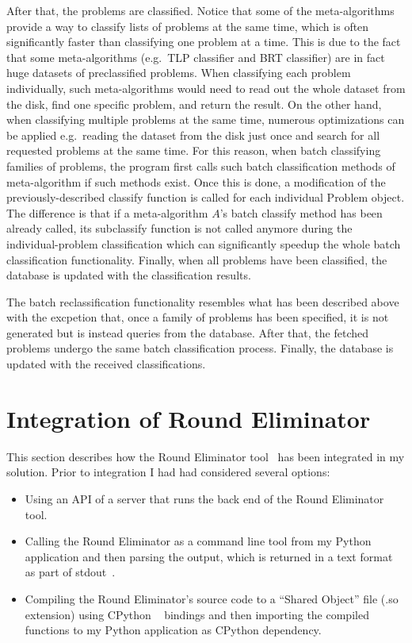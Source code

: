 After that, the problems are classified. Notice that
some of the meta-algorithms provide a way to classify
lists of problems at the same time, which is often
significantly faster than classifying one problem at a time.
This is due to the fact that some meta-algorithms
(e.g.\ TLP classifier and BRT classifier) are in fact
huge datasets of preclassified problems. When
classifying each problem individually, such
meta-algorithms would need to read out the whole
dataset from the disk, find one specific problem,
and return the result. On the other hand, when
classifying multiple problems at the same time,
numerous optimizations can be applied e.g.\ reading the 
dataset from the disk just once and search for all
requested problems at the same time. For this reason,
when batch classifying families of problems, the program first
calls such batch classification methods of meta-algorithm
if such methods exist. Once this is done, a modification
of the previously-described classify function is called
for each individual Problem object. The difference is
that if a meta-algorithm $A$'s batch classify method has been
already called, its subclassify function is not called
anymore during the individual-problem classification which
can significantly speedup the whole batch classification
functionality. Finally, when all problems have been classified,
the database is updated with the classification results.

The batch reclassification functionality resembles
what has been described above with the excpetion that,
once a family of problems has been specified, it is
not generated but is instead queries from the database.
After that, the fetched problems undergo the same
batch classification process. Finally, the database is
updated with the received classifications.

\section{Integration of Round Eliminator}

This section describes how the Round Eliminator
tool~\cite{Olivetti2020} has been integrated in my solution.
Prior to integration I had had considered several options:

\begin{itemize}
  \item Using an API of a server that runs the back end of the Round Eliminator tool.
  \item Calling the Round Eliminator as a command line tool from my Python
  application and then parsing the output, which is returned
  in a text format as part of stdout~\cite{stdio}.
  \item Compiling the Round Eliminator's source code to a ``Shared Object'' file (.so extension)
  using CPython ~\cite{CPython} bindings and then importing the compiled
  functions to my Python application as CPython dependency.
\end{itemize}

